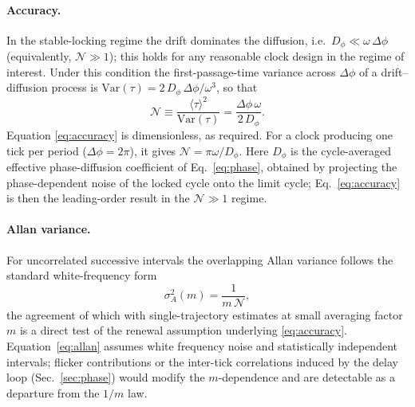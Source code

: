\documentclass[aps,pre,reprint,amsmath,amssymb,floatfix,nofootinbib]{revtex4-2}
\newcommand{\avg}[1]{\langle #1 \rangle}
\newcommand{\Dphi}{D_{\phi}}
\begin{document}
\paragraph*{Accuracy.}
In the stable-locking regime the drift dominates the diffusion, i.e.\
$\Dphi \ll \omega\,\Delta\phi$ (equivalently, $\mathcal{N}\gg1$); this
holds for any reasonable clock design in the regime of interest.
Under this condition the first-passage-time variance across $\Delta\phi$
of a drift--diffusion process is
$\mathrm{Var}(\tau)=2\,\Dphi\,\Delta\phi/\omega^{3}$, so that
\begin{equation}
  \boxed{\;
  \mathcal{N} \equiv \frac{\avg{\tau}^2}{\mathrm{Var}(\tau)}
  = \frac{\Delta\phi\,\omega}{2\,\Dphi}.
  \;}
  \label{eq:accuracy}
\end{equation}
Equation \eqref{eq:accuracy} is dimensionless, as required. For a clock
producing one tick per period ($\Delta\phi=2\pi$), it gives
$\mathcal{N}=\pi\omega/\Dphi$. Here $\Dphi$ is the cycle-averaged
effective phase-diffusion coefficient of Eq.~\eqref{eq:phase}, obtained by
projecting the phase-dependent noise of the locked cycle onto the limit
cycle; Eq.~\eqref{eq:accuracy} is then the leading-order result in the
$\mathcal{N}\gg1$ regime.

\paragraph*{Allan variance.}
For uncorrelated successive intervals the overlapping Allan variance
follows the standard white-frequency form~\cite{Allan1966}
\begin{equation}
  \sigma_A^2(m) = \frac{1}{m\,\mathcal{N}},
  \label{eq:allan}
\end{equation}
the agreement of which with single-trajectory estimates at small averaging
factor $m$ is a direct test of the renewal assumption underlying
\eqref{eq:accuracy}. Equation~\eqref{eq:allan} assumes white frequency
noise and statistically independent intervals; flicker contributions or
the inter-tick correlations induced by the delay loop
(Sec.~\ref{sec:phase}) would modify the $m$-dependence and are detectable
as a departure from the $1/m$ law.
\end{document}
